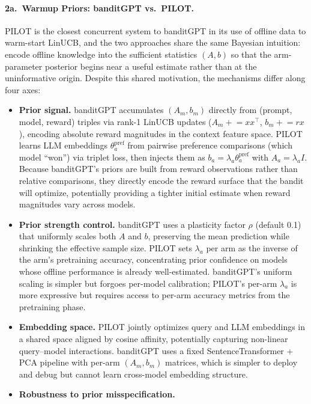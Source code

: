 \paragraph{2a.\ Warmup Priors: banditGPT vs.\ PILOT.}
PILOT is the closest concurrent system to banditGPT in its use of offline
data to warm-start LinUCB, and the two approaches share the same Bayesian
intuition: encode offline knowledge into the sufficient statistics
$(A, b)$ so that the arm-parameter posterior begins near a useful estimate
rather than at the uninformative origin.
Despite this shared motivation, the mechanisms differ along four axes:
\begin{itemize}[nosep]
  \item \textbf{Prior signal.}
    banditGPT accumulates $(A_m, b_m)$ directly from (prompt, model, reward)
    triples via rank-1 LinUCB updates ($A_m \mathrel{+}= xx^\top$,
    $b_m \mathrel{+}= rx$), encoding absolute reward magnitudes in the
    context feature space.
    PILOT learns LLM embeddings $\theta_a^{\mathrm{pref}}$ from pairwise
    preference comparisons (which model ``won'') via triplet loss, then
    injects them as $b_a{=}\lambda_a\theta_a^{\mathrm{pref}}$ with
    $A_a{=}\lambda_a I$.
    Because banditGPT's priors are built from reward observations rather
    than relative comparisons, they directly encode the reward surface
    that the bandit will optimize, potentially providing a tighter initial
    estimate when reward magnitudes vary across models.
  \item \textbf{Prior strength control.}
    banditGPT uses a plasticity factor $\rho$ (default 0.1) that uniformly
    scales both $A$ and $b$, preserving the mean prediction while shrinking
    the effective sample size.
    PILOT sets $\lambda_a$ per arm as the inverse of the arm's pretraining
    accuracy, concentrating prior confidence on models whose offline
    performance is already well-estimated.
    banditGPT's uniform scaling is simpler but forgoes per-model calibration;
    PILOT's per-arm $\lambda_a$ is more expressive but requires access to
    per-arm accuracy metrics from the pretraining phase.
  \item \textbf{Embedding space.}
    PILOT jointly optimizes query and LLM embeddings in a shared space
    aligned by cosine affinity, potentially capturing non-linear
    query--model interactions.
    banditGPT uses a fixed SentenceTransformer + PCA pipeline with per-arm
    $(A_m, b_m)$ matrices, which is simpler to deploy and debug but cannot
    learn cross-model embedding structure.
  \item \textbf{Robustness to prior misspecification.}

\end{itemize}
